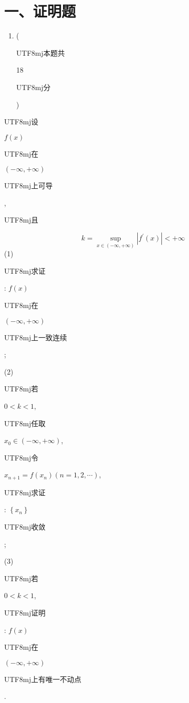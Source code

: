\documentclass[10pt]{article}
\begin{document}
\section{一、证明题}
\begin{enumerate}
  \item (\begin{CJK}{UTF8}{mj}本题共\end{CJK} 18 \begin{CJK}{UTF8}{mj}分\end{CJK})
\end{enumerate}
\begin{CJK}{UTF8}{mj}设\end{CJK} $f(x)$ \begin{CJK}{UTF8}{mj}在\end{CJK} $(-\infty,+\infty)$ \begin{CJK}{UTF8}{mj}上可导\end{CJK}, \begin{CJK}{UTF8}{mj}且\end{CJK}
$$
k=\sup _{x \in(-\infty,+\infty)}\left|f^{\prime}(x)\right|<+\infty
$$
(1) \begin{CJK}{UTF8}{mj}求证\end{CJK}: $f(x)$ \begin{CJK}{UTF8}{mj}在\end{CJK} $(-\infty,+\infty)$ \begin{CJK}{UTF8}{mj}上一致连续\end{CJK};

(2) \begin{CJK}{UTF8}{mj}若\end{CJK} $0<k<1$, \begin{CJK}{UTF8}{mj}任取\end{CJK} $x_{0} \in(-\infty,+\infty)$, \begin{CJK}{UTF8}{mj}令\end{CJK} $x_{n+1}=f\left(x_{n}\right)(n=1,2, \cdots)$, \begin{CJK}{UTF8}{mj}求证\end{CJK}: $\left\{x_{n}\right\}$ \begin{CJK}{UTF8}{mj}收敛\end{CJK};

(3) \begin{CJK}{UTF8}{mj}若\end{CJK} $0<k<1$, \begin{CJK}{UTF8}{mj}证明\end{CJK}: $f(x)$ \begin{CJK}{UTF8}{mj}在\end{CJK} $(-\infty,+\infty)$ \begin{CJK}{UTF8}{mj}上有唯一不动点\end{CJK}.
\end{document}
